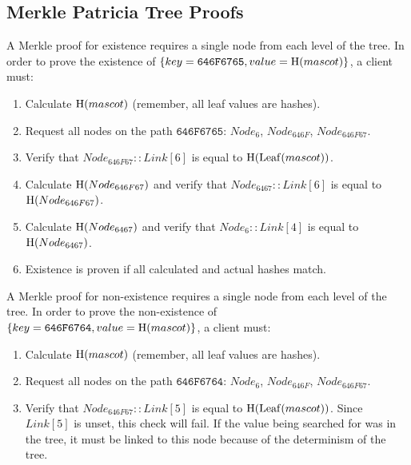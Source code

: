 \subsection{Merkle Patricia Tree Proofs}

A Merkle proof for existence requires a single node from each level of the tree.
In order to prove the existence of $\{key = \texttt{646F6765}, value = \operatorname{H}(mascot)\}$, a client must:
\begin{enumerate}
	\item{Calculate $\operatorname{H}(mascot)$ (remember, all leaf values are hashes).}
	\item{Request all nodes on the path $\texttt{646F6765}$: $Node_{6}$, $Node_{646F}$, $Node_{646F67}$.}
	\item{Verify that $Node_{646F67}::Link[6]$ is equal to $\operatorname{H}(\operatorname{Leaf}(mascot))$.}
	\item{Calculate $\operatorname{H}(Node_{646F67})$ and verify that $Node_{6467}::Link[6]$ is equal to $\operatorname{H}(Node_{646F67})$.}
	\item{Calculate $\operatorname{H}(Node_{6467})$ and verify that $Node_{6}::Link[4]$ is equal to $\operatorname{H}(Node_{6467})$.}
	\item{Existence is proven if all calculated and actual hashes match.}
\end{enumerate}

A Merkle proof for non-existence requires a single node from each level of the tree.
In order to prove the non-existence of $\{key = \texttt{646F6764}, value = \operatorname{H}(mascot)\}$, a client must:
\begin{enumerate}
	\item{Calculate $\operatorname{H}(mascot)$ (remember, all leaf values are hashes).}
	\item{Request all nodes on the path $\texttt{646F6764}$: $Node_{6}$, $Node_{646F}$, $Node_{646F67}$.}
	\item{
		Verify that $Node_{646F67}::Link[5]$ is equal to $\operatorname{H}(\operatorname{Leaf}(mascot))$.
		Since $Link[5]$ is unset, this check will fail.
		If the value being searched for was in the tree, it must be linked to this node because of the determinism of the tree.
	 }
\end{enumerate}

